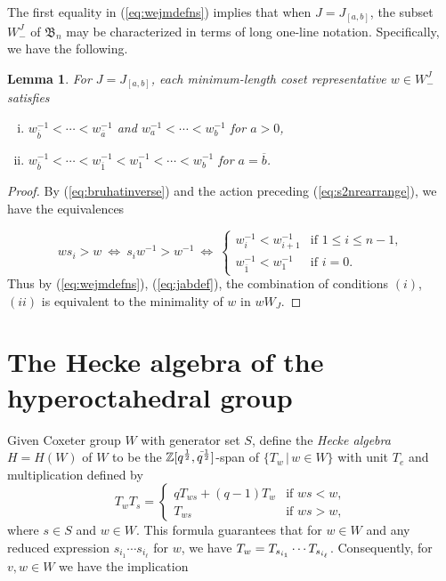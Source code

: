 \documentclass[12pt]{amsart}
\newtheorem{lem}[thm]{Lemma}
\theoremstyle{definition}
\numberwithin{equation}{section}
\newcommand{\bn}{\mathfrak{B}_n}
\newcommand{\zqq}{\mathbb{Z}[\qp12, \qm12]}
\newcommand{\qp}[2]{q^{\frac{#1}{#2}}}
\newcommand{\qm}[2]{q^{\negthinspace\Bar\,\frac{#1}{#2}}}
\newcommand{\ol}[1]{\overline{#1}}
\newcommand{\Wejm}{W^J_-}
\begin{document}
The first equality in (\ref{eq:wejmdefns}) implies that when $J = J_{[a,b]}$, the subset $\Wejm$ of $\bn$ may be characterized in terms
of long one-line notation.  Specifically, we have the following.

\begin{lem}\label{l:minreps}
For $J = J_{[a,b]}$, each minimum-length coset representative $w \in \Wejm$ satisfies

\begin{enumerate}[(i)]
    \item %
    $w_{\ol b}^{-1} < \cdots < w_{\ol a}^{-1}$ and $w_a^{-1} < \cdots < w_b^{-1}$ for $a > 0$, 
\item $w_{\ol b}^{-1} < \cdots < w_{\ol1}^{-1} < w_1^{-1} < \cdots < w_b^{-1}$ for $a = \ol b$.
\end{enumerate}
\end{lem}


\begin{proof}
By 
(\ref{eq:bruhatinverse}) and
the action preceding (\ref{eq:s2nrearrange}), we have the equivalences

\begin{equation*}
    ws_i > w
    \ \Longleftrightarrow\
    s_i w^{-1} > w^{-1}
    \ \Longleftrightarrow\
\begin{cases}
    w_i^{-1}<w_{i+1}^{-1}
    &\text{if $1 \leq i \leq n-1$},\\
    w_{\ol1}^{-1} < w_1^{-1}
    &\text{if $i = 0$}.
\end{cases}
\end{equation*}
Thus by (\ref{eq:wejmdefns}), (\ref{eq:jabdef}), the combination of conditions $(i)$, $(ii)$
is equivalent to the minimality of $w$ in 
$wW_J$.
\end{proof}


\section{The Hecke algebra of the hyperoctahedral group}\label{sec: Hecke algebra}

Given Coxeter group $W$ with generator set $S$, define
the {\em Hecke algebra} $H = H(W)$ of $W$ to be
the $\zqq$-span of $\{ T_w \,|\, w \in W \}$
with unit $T_e$ and multiplication defined by
\begin{equation}\label{eq:genlhecke}
  T_wT_s =
  \begin{cases}
    qT_{ws} + (q-1)T_w &\text{if $ws < w$},\\
    T_{ws} &\text{if $ws > w$},
  \end{cases}
\end{equation}
where $s \in S$ and $w \in W$. This formula guarantees that for $w \in W$ and
any reduced expression $s_{i_1} \cdots s_{i_\ell}$ for $w$, we have $T_w = \smash{T_{s_{i_1}} \cdots T_{s_{i_\ell}}}$.
Consequently, for $v, w \in W$ we have the implication
\end{document}
